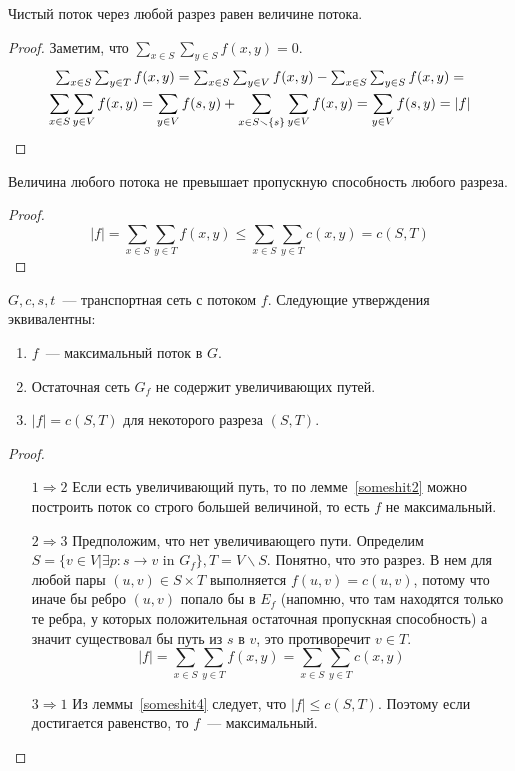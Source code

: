 \begin{lemma}\label{someshit3}
	Чистый поток через любой разрез равен величине потока.
\end{lemma}
\begin{proof}
	Заметим, что $\sum_{x\in S}\sum_{y\in S}f(x,y)=0$.
	\begin{multline*}
	$$
	\sum_{x\in S}\sum_{y\in T}f(x,y)=\sum_{x\in S}\sum_{y\in V}f(x,y)-\sum_{x\in S}\sum_{y\in S}f(x,y)=\\
	\sum_{x\in S}\sum_{y\in V}f(x,y)=\sum_{y\in V}f(s,y)+\sum_{x\in S\smallsetminus \{s\}}\sum_{y\in V}f(x,y)=\sum_{y\in V}f(s,y)=|f|
	$$
	\end{multline*}
\end{proof}
\begin{lemma}\label{someshit4}
	Величина любого потока не превышает пропускную способность любого разреза.
\end{lemma}
\begin{proof}
	$$
	|f|=\sum_{x\in S}\sum_{y\in T}f(x,y)\le\sum_{x\in S}\sum_{y\in T}c(x,y)=c(S,T)
	$$
\end{proof}
\begin{theorem}\label{maxflowmincut}
	$G,c,s,t$~--- транспортная сеть с потоком $f$. Следующие утверждения эквивалентны:
	\begin{enumerate}
		\item $f$~--- максимальный поток в $G$.
		\item Остаточная сеть $G_f$ не содержит увеличивающих путей.
		\item $|f|=c(S,T)$ для некоторого разреза $(S,T)$.
	\end{enumerate}
\end{theorem}
\begin{proof}$ $\newline %
	\begin{itemize}
		\item[$\mathrm{1}\Rightarrow\mathrm{2}$] Если есть увеличивающий путь, то по лемме~\ref{someshit2} можно построить поток со строго большей величиной, то есть $f$ не максимальный.
		\item[$\mathrm{2}\Rightarrow\mathrm{3}$] Предположим, что нет увеличивающего пути. Определим $S=\{v\in V|\exists p\colon s\to v\textrm{ in }G_f\}, T=V\smallsetminus S$. Понятно, что это разрез. В нем для любой пары $(u,v)\in S\times T$ выполняется $f(u,v)=c(u,v)$, потому что иначе бы ребро $(u,v)$ попало бы в $E_f$ (напомню, что там находятся только те ребра, у которых положительная остаточная пропускная способность) а значит существовал бы путь из $s$ в $v$, это противоречит $v\in T$. $$|f|=\sum_{x\in S}\sum_{y\in T}f(x,y)=\sum_{x\in S}\sum_{y\in T}c(x,y)$$
		\item[$\mathrm{3}\Rightarrow\mathrm{1}$] Из леммы~\ref{someshit4} следует, что $|f|\le c(S,T)$. Поэтому если достигается равенство, то $f$~--- максимальный.
	\end{itemize}
\end{proof}

